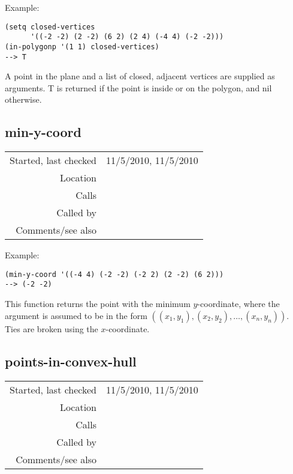 \vspace{0.5cm}
\noindent Example:
\begin{verbatim}
(setq closed-vertices
      '((-2 -2) (2 -2) (6 2) (2 4) (-4 4) (-2 -2)))
(in-polygonp '(1 1) closed-vertices)
--> T
\end{verbatim}

\noindent A point in the plane and a list of closed,
adjacent vertices are supplied as arguments. T is
returned if the point is inside or on the polygon, and
nil otherwise.


\subsection*{min-y-coord}\label{fun:min-y-coord}

\vspace{0.3cm}
\begin{tabular}{r|p{8cm}}
Started, last checked & 11/5/2010, 11/5/2010 \\
Location & \nameref{sec:geometric-operations} \\
Calls & \\
Called by & \nameref{fun:convex-hull} \\
Comments/see also & 
\end{tabular}

\vspace{0.5cm}
\noindent Example:
\begin{verbatim}
(min-y-coord '((-4 4) (-2 -2) (-2 2) (2 -2) (6 2)))
--> (-2 -2)
\end{verbatim}

\noindent This function returns the point with the
minimum $y$-coordinate, where the argument is assumed
to be in the form $((x_1, y_1), (x_2, y_2),\ldots,
(x_n, y_n))$. Ties are broken using the
$x$-coordinate.


\subsection*{points-in-convex-hull}\label{fun:points-in-convex-hull}

\vspace{0.3cm}
\begin{tabular}{r|p{8cm}}
Started, last checked & 11/5/2010, 11/5/2010 \\
Location & \nameref{sec:geometric-operations} \\
Calls & \\
Called by & \\
Comments/see also & 
\end{tabular}


